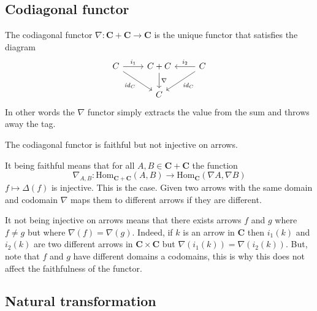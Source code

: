 \documentclass{book}
\theoremstyle{definition}
\newcommand\id{\mathit{id}}
\newcommand\Hom{\text{Hom}}
\begin{document}
\subsection{Codiagonal functor}

The codiagonal functor $\nabla : \mathbf{C} + \mathbf{C} \to \mathbf{C}$ is the unique
functor that satisfies the diagram
\[
  \begin{tikzcd}
    C \ar[r, "i_{1}"] \ar[dr, "\id_{C}"'] & C + C \ar[d, "\nabla"] & C \ar[l, "i_{2}"'] \ar[dl, "\id_{C}"] \\
    & C
  \end{tikzcd}
\]
In other words the $\nabla$ functor simply extracts the value from the sum and throws
away the tag.

The codiagonal functor is faithful but not injective on arrows.

It being faithful means that for all $A, B \in \mathbf{C} + \mathbf{C}$ the function
\[
  \nabla_{A,B} : \Hom_{\mathbf{C}+\mathbf{C}}(A, B) \to \Hom_{\mathbf{C}}(\nabla A, \nabla B)
\]
$f \mapsto \Delta(f)$ is injective. This is the case. Given two arrows with the same domain
and codomain $\nabla$ maps them to different arrows if they are different.

It not being injective on arrows means that there exists arrows $f$ and $g$
where $f \neq g$ but where $\nabla(f) = \nabla(g)$. Indeed, if $k$ is an arrow in
$\mathbf{C}$ then $i_{1}(k)$ and $i_{2}(k)$ are two different arrows in
$\mathbf{C} \times \mathbf{C}$ but $\nabla (i_{1}(k)) = \nabla (i_{2}(k))$. But, note that
$f$ and $g$ have different domains a codomains, this is why this does not affect
the faithfulness of the functor.

\subsection{Natural transformation}
\end{document}
